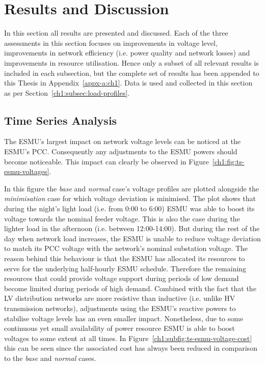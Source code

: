 \section{Results and Discussion}
\label{ch1:sec:results-and-discussion}

In this section all results are presented and discussed.
Each of the three assessments in this section focuses on improvements in voltage level, improvements in network efficiency (i.e. power quality and network losses) and improvements in resource utilisation.
Hence only a subset of all relevant results is included in each subsection, but the complete set of results has been appended to this Thesis in Appendix~\ref{appx-a:ch1}.
Data is used and collected in this section as per Section~\ref{ch1:subsec:load-profiles}.

\subsection{Time Series Analysis}
\label{ch1:subsec:time-series-analysis}

The ESMU's largest impact on network voltage levels can be noticed at the ESMU's PCC.
Consequently any adjustments to the ESMU powers should become noticeable.
This impact can clearly be observed in Figure~\ref{ch1:fig:ts-esmu-voltages}.



In this figure the \textit{base} and \textit{normal} case's voltage profiles are plotted alongside the \textit{minimisation} case for which voltage deviation is minimised.
The plot shows that during the night's light load (i.e. from 0:00 to 6:00) ESMU was able to boost its voltage towards the nominal feeder voltage.
This is also the case during the lighter load in the afternoon (i.e. between 12:00-14:00).
But during the rest of the day when network load increases, the ESMU is unable to reduce voltage deviation to match its PCC voltage with the network's nominal substation voltage.
The reason behind this behaviour is that the ESMU has allocated its resources to serve for the underlying half-hourly ESMU schedule.
Therefore the remaining resources that could provide voltage support during periods of low demand become limited during periods of high demand.
Combined with the fact that the LV distribution networks are more resistive than inductive (i.e. unlike HV transmission networks), adjustments using the ESMU's reactive powers to stabilise voltage levels has an even smaller impact.
Nonetheless, due to some continuous yet small availability of power resource ESMU is able to boost voltages to some extent at all times.
In Figure~\ref{ch1:subfig:ts-esmu-voltage-cost} this can be seen since the associated cost has always been reduced in comparison to the \textit{base} and \textit{normal} cases.


